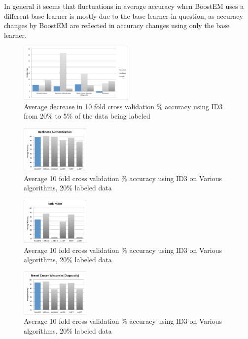 \documentclass{sig-alternate}
\begin{document}
In general it seems that fluctuations in average accuracy when BoostEM uses a different base learner is mostly due to the base learner in question, as accuracy changes by BoostEM are reflected in accuracy changes using only the base learner.
 
\begin{figure}
\centering
\includegraphics[width=0.5\textwidth]{figures/accDrops.pdf}
\caption{Average decrease in 10 fold cross validation \% accuracy using ID3 from 20\% to 5\% of the data being labeled}
\label{accDrop}
\end{figure}
 
\begin{figure}
\centering
\includegraphics[width=0.3\textwidth]{figures/bankAcc.pdf}
\caption{Average 10 fold cross validation \% accuracy using ID3 on Various algorithms, 20\% labeled data}
\label{bankAcc}
\end{figure}
\begin{figure}
\centering
\includegraphics[width=0.3\textwidth]{figures/parkAcc.pdf}
\caption{Average 10 fold cross validation \% accuracy using ID3 on Various algorithms, 20\% labeled data}
\label{parkAcc}
\end{figure}

\begin{figure}
\centering
\includegraphics[width=0.3\textwidth]{figures/breaAcc.pdf}
\caption{Average 10 fold cross validation \% accuracy using ID3 on Various algorithms, 20\% labeled data}
\label{breaAcc}
\end{figure}
\end{document}
